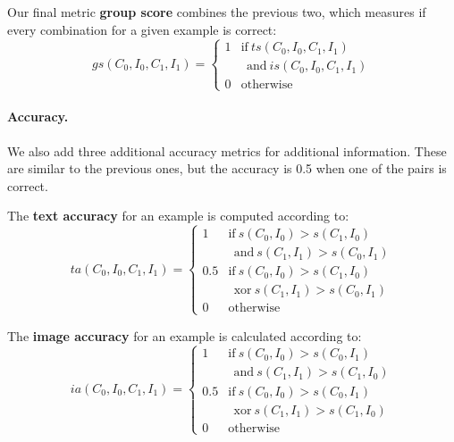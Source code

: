 Our final metric \textbf{group score} combines the previous two, which measures if every combination for a given example is correct:
\begin{equation}\label{eq:group-score}
        gs(C_{0},I_{0},C_{1},I_{1})= 
    \begin{cases}
        1 & \text{if}\  ts(C_{0},I_{0},C_{1},I_{1})  \\
         & \ \ \text{and}\ is(C_{0},I_{0},C_{1},I_{1})\\
        0              & \text{otherwise}
    \end{cases}
\end{equation}

\paragraph{Accuracy.}
We also add three additional accuracy metrics for additional information. These are similar to the previous ones, but the accuracy is 0.5 when one of the pairs is correct.

The \textbf{text accuracy} for an example is computed according to:
\begin{equation}\label{eq:text-accuracy}
        ta(C_{0},I_{0},C_{1},I_{1})= 
    \begin{cases}
        1 & \text{if}\  s(C_{0}, I_{0}) > s(C_{1}, I_{0}) \\
        & \ \ \text{and}\ s(C_{1}, I_{1}) > s(C_{0}, I_{1}) \\
        0.5 & \text{if}\  s(C_{0}, I_{0}) > s(C_{1}, I_{0}) \\
        & \ \ \text{xor}\ s(C_{1}, I_{1}) > s(C_{0}, I_{1}) \\
        0              & \text{otherwise}
    \end{cases}
\end{equation}

The \textbf{image accuracy} for an example is calculated according to:
\begin{equation}\label{eq:image-accuracy}
        ia(C_{0},I_{0},C_{1},I_{1})= 
    \begin{cases}
        1 & \text{if}\  s(C_{0}, I_{0}) > s(C_{0}, I_{1})\\
        & \ \ \text{and}\ s(C_{1}, I_{1}) > s(C_{1}, I_{0}) \\
        0.5 & \text{if}\  s(C_{0}, I_{0}) > s(C_{0}, I_{1})\\
        & \ \ \text{xor}\ s(C_{1}, I_{1}) > s(C_{1}, I_{0}) \\
        0              & \text{otherwise}
    \end{cases}
\end{equation}

